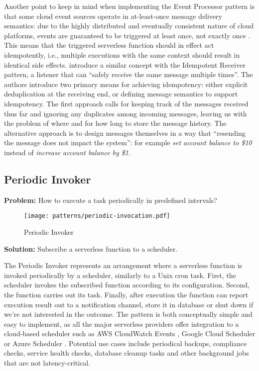 Another point to keep in mind when implementing the Event Processor pattern is that some cloud event sources operate in at-least-once message delivery semantics: due to the highly distributed and eventually consistent nature of cloud platforms, events are guaranteed to be triggered at least once, not exactly once \parencite{awslambda0218}. This means that the triggered serverless function should in effect act idempotently, i.e., multiple executions with the same context should result in identical side effects. \textcite{hohpe2004enterprise} introduce a similar concept with the Idempotent Receiver pattern, a listener that can ``safely receive the same message multiple times''. The authors introduce two primary means for achieving idempotency: either explicit deduplication at the receiving end, or defining message semantics to support idempotency. The first approach calls for keeping track of the messages received thus far and ignoring any duplicates among incoming messages, leaving us with the problem of where and for how long to store the message history. The alternative approach is to design messages themselves in a way that ``resending the message does not impact the system'': for example \textit{set account balance to \$10} instead of \textit{increase account balance by \$1}.

\subsection{Periodic Invoker} \label{subsec:periodicInvocation}

\textbf{Problem:} How to execute a task periodically in predefined intervals?

\begin{figure}[h]
  \centering
  \texttt{[image: patterns/periodic-invocation.pdf]}
  \caption{Periodic Invoker}
  \label{fig:patternPeriodicInvocation}
\end{figure}

\textbf{Solution:} Subscribe a serverless function to a scheduler.

The Periodic Invoker represents an arrangement where a serverless function is invoked periodically by a scheduler, similarly to a Unix cron task. First, the scheduler invokes the subscribed function according to its configuration. Second, the function carries out its task. Finally, after execution the function can report execution result out to a notification channel, store it in database or shut down if we're not interested in the outcome. The pattern is both conceptually simple and easy to implement, as all the major serverless providers offer integration to a cloud-based scheduler such as AWS CloudWatch Events \parencite{awslambda0218}, Google Cloud Scheduler \parencite{google18cloudFunctions} or Azure Scheduler \parencite{microsoft18azureFunctions}. Potential use cases include periodical backups, compliance checks, service health checks, database cleanup tasks and other background jobs that are not latency-critical. \parencite{hong18securingviaserverlesspatterns}

